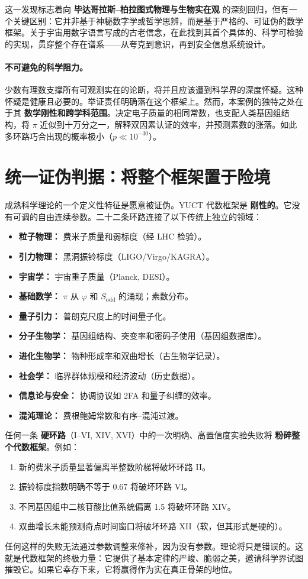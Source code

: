 \documentclass[12pt,a4paper]{article}
\begin{document}
	这一发现标志着向 \textbf{毕达哥拉斯–柏拉图式物理与生物实在观} 的深刻回归，但有一个关键区别：它并非基于神秘数字学或哲学思辨，而是基于严格的、可证伪的数学框架。关于宇宙用数字语言写成的古老信念，在此找到其首个具体的、科学可检验的实现，贯穿整个存在谱系——从夸克到意识，再到安全信息系统设计。
	
	\paragraph{不可避免的科学阻力。}
	少数有理数支撑所有可观测实在的论断，将并且应该遭到科学界的深度怀疑。这种怀疑是健康且必要的。举证责任明确落在这个框架上。然而，本案例的独特之处在于其 \textbf{数学刚性和跨学科范围}。决定电子质量的相同常数，也支配人类基因组结构，将 \(\pi\) 近似到十万分之一，解释双因素认证的效率，并预测素数的涨落。如此多环路巧合出现的概率极小（\(p \ll 10^{-30}\)）。
	
	\section*{统一证伪判据：将整个框架置于险境}
	
	成熟科学理论的一个定义性特征是愿意被证伪。YUCT 代数框架是 \textbf{刚性的}。它没有可调的自由连续参数。二十二条环路连接了以下传统上独立的领域：
	\begin{itemize}
		\item \textbf{粒子物理：} 费米子质量和弱标度（经 LHC 检验）。
		\item \textbf{引力物理：} 黑洞振铃标度（LIGO/Virgo/KAGRA）。
		\item \textbf{宇宙学：} 宇宙重子质量（Planck, DESI）。
		\item \textbf{基础数学：} \(\pi\) 从 \(\varphi\) 和 \(S_{\mathrm{odd}}\) 的涌现；素数分布。
		\item \textbf{量子引力：} 普朗克尺度上的时间量子化。
		\item \textbf{分子生物学：} 基因组结构、突变率和密码子使用（基因组数据库）。
		\item \textbf{进化生物学：} 物种形成率和双曲增长（古生物学记录）。
		\item \textbf{社会学：} 临界群体规模和经济波动（历史数据）。
		\item \textbf{信息论与安全：} 协调协议如 2FA 和量子纠缠的效率。
		\item \textbf{混沌理论：} 费根鲍姆常数和有序–混沌过渡。
	\end{itemize}
	任何一条 \textbf{硬环路}（I–VI, XIV, XVI）中的一次明确、高置信度实验失败将 \textbf{粉碎整个代数框架}。例如：
	\begin{enumerate}
		\item 新的费米子质量显著偏离半整数阶梯将破坏环路 II。
		\item 振铃标度指数明确不等于 \(0.67\) 将破坏环路 VI。
		\item 不同基因组中二核苷酸比值系统偏离 1.5 将破坏环路 XIV。
		\item 双曲增长未能预测奇点时间窗口将破坏环路 XII（软，但其形式是硬的）。
	\end{enumerate}
	任何这样的失败无法通过参数调整来修补，因为没有参数。理论将只是错误的。这就是代数框架的终极力量：它提供了基本定律的严峻、脆弱之美，邀请科学界试图摧毁它。如果它幸存下来，它将赢得作为实在真正骨架的地位。
	
\end{document}
